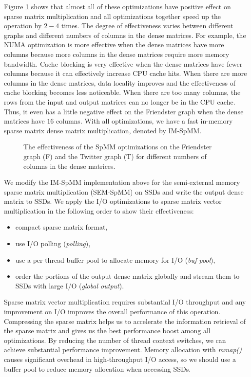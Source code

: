 Figure \ref{perf:spmm_opt} shows that almost all of these optimizations have
positive effect on sparse matrix multiplication and all optimizations
together speed up the operation by $2-4$ times. The degree of effectiveness
varies between different graphs and different numbers of columns in
the dense matrices. For example, the NUMA optimization is more effective when
the dense matrices have more columns because more columns in the dense matrices
require more memory bandwidth. Cache blocking is very effective when
the dense matrices have fewer columns because it can effectively increase CPU
cache hits. When there are more columns in the dense matrices, data locality
improves and the effectiveness of cache blocking becomes less noticeable.
When there are too many columns, the rows from
the input and output matrices can no longer be in the CPU cache. Thus, it even
has a little negative effect on the Friendster graph when the dense matrices
have $16$ columns. With all optimizations, we have a fast in-memory sparse
matrix dense matrix multiplication, denoted by IM-SpMM.

\begin{figure}
	\begin{center}
		\footnotesize
		
		\caption{The effectiveness of the SpMM optimizations on the Friendster
			graph (F) and the Twitter graph (T) for different numbers of
			columns in the dense matrices.}
		\label{perf:spmm_opt}
	\end{center}
\end{figure}

We modify the IM-SpMM implementation above for the semi-external memory sparse
matrix multiplication (SEM-SpMM) on SSDs and write the output dense matrix to
SSDs. We apply the I/O optimizations to sparse matrix vector multiplication
in the following order to show their effectiveness: 
\begin{itemize} \itemsep1pt \parskip0pt 
	\item compact sparse matrix format,
	\item use I/O polling (\textit{polling}),
	\item use a per-thread buffer pool to allocate memory for I/O
		(\textit{buf pool}),
	\item order the portions of the output dense matrix globally and stream them
		to SSDs with large I/O (\textit{global output}).
\end{itemize}

Sparse matrix vector multiplication requires substantial I/O throughput and
any improvement on I/O improves the overall performance of this operation.
Compressing the sparse matrix helps us to accelerate the information retrieval
of the sparse matrix and gives us the best performance boost among all
optimizations. By reducing the number of thread context switches, we can
achieve substantial performance improvement. Memory allocation with
\textit{mmap()} causes significant overhead in high-throughput I/O access,
so we should use a buffer pool to reduce memory allocation when accessing SSDs.

